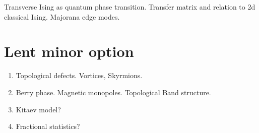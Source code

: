 Transverse Ising as quantum phase transition. Transfer matrix and relation to 2d classical Ising. Majorana edge modes.


\section{Lent minor option}


\begin{enumerate}

\item Topological defects. Vortices, Skyrmions. 

\item Berry phase. Magnetic monopoles. Topological Band structure.

\item Kitaev model?

\item Fractional statistics?
\end{enumerate}